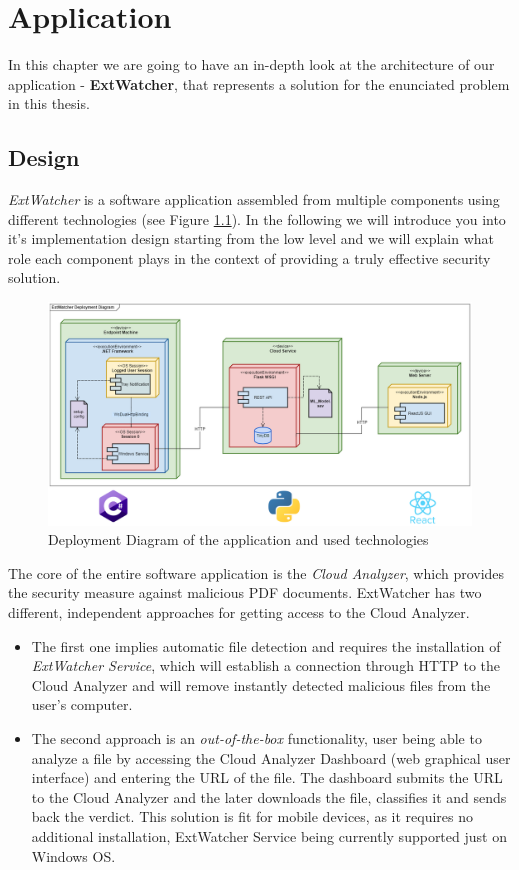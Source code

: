 \chapter{Application}
\label{chapter:application}
In this chapter we are going to have an in-depth look at the architecture of our application - \textbf{ExtWatcher}, that represents a solution for the enunciated problem in this thesis.


\section{Design}
\label{section:design}
\textit{ExtWatcher} is a software application assembled from multiple components using different technologies (see Figure \ref{deployment}). In the following we will introduce you into it's implementation design starting from the low level and we will explain what role each component plays in the context of providing a truly effective security solution. 

\begin{figure}[H]
	\centerline{\includegraphics[scale=0.4]{figures/deployTech.png}}  
	\caption{Deployment Diagram of the application and used technologies}
	\label{deployment}
\end{figure}

The core of the entire software application is the \textit{Cloud Analyzer}, which provides the security measure against malicious PDF documents. ExtWatcher has two different, independent approaches for getting access to the Cloud Analyzer. 

\begin{itemize}
	\item The first one implies automatic file detection and requires the installation of \textit{ExtWatcher Service}, which will establish a connection through HTTP to the Cloud Analyzer and will remove instantly detected malicious files from the user's computer.
	\item The second approach is an \textit{out-of-the-box} functionality, user being able to analyze a file by accessing the Cloud Analyzer Dashboard (web graphical user interface) and entering the URL of the file. The dashboard submits the URL to the Cloud Analyzer and the later downloads the file, classifies it and sends back the verdict. This solution is fit for mobile devices, as it requires no additional installation, ExtWatcher Service being currently supported just on Windows OS.
\end{itemize}

